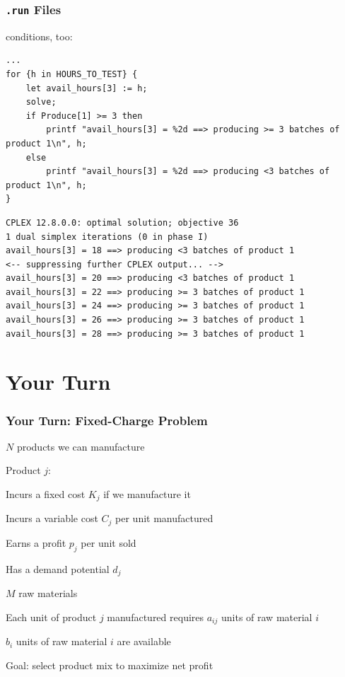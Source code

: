 \begin{frame}[fragile]

	\frametitle{{\tt .run} Files}
	
	\bit
	\item {} conditions, too:
	\eit

\begin{lstlisting}
...
for {h in HOURS_TO_TEST} {
	let avail_hours[3] := h;
	solve;
	if Produce[1] >= 3 then 
		printf "avail_hours[3] = %2d ==> producing >= 3 batches of product 1\n", h;
	else 
		printf "avail_hours[3] = %2d ==> producing <3 batches of product 1\n", h;
}
\end{lstlisting}

\begin{lstlisting}
CPLEX 12.8.0.0: optimal solution; objective 36
1 dual simplex iterations (0 in phase I)
avail_hours[3] = 18 ==> producing <3 batches of product 1
<-- suppressing further CPLEX output... -->
avail_hours[3] = 20 ==> producing <3 batches of product 1
avail_hours[3] = 22 ==> producing >= 3 batches of product 1
avail_hours[3] = 24 ==> producing >= 3 batches of product 1
avail_hours[3] = 26 ==> producing >= 3 batches of product 1
avail_hours[3] = 28 ==> producing >= 3 batches of product 1
\end{lstlisting}

\end{frame}





\section{Your Turn}


\begin{frame}[fragile]

	\frametitle{Your Turn: Fixed-Charge Problem}

	\bit
	\item $N$ products we can manufacture
	\item Product $j$:
		\bit
		\item Incurs a fixed cost $K_j$ if we manufacture it
		\item Incurs a variable cost $C_j$ per unit manufactured
		\item Earns a profit $p_j$ per unit sold
		\item Has a demand potential $d_j$
		\eit
	\item $M$ raw materials
	\item Each unit of product $j$ manufactured requires $a_{ij}$ units of raw material $i$
	\item $b_i$ units of raw material $i$ are available
	\item Goal: select  product mix to maximize net profit
	\eit
	
	
\end{frame}
	
